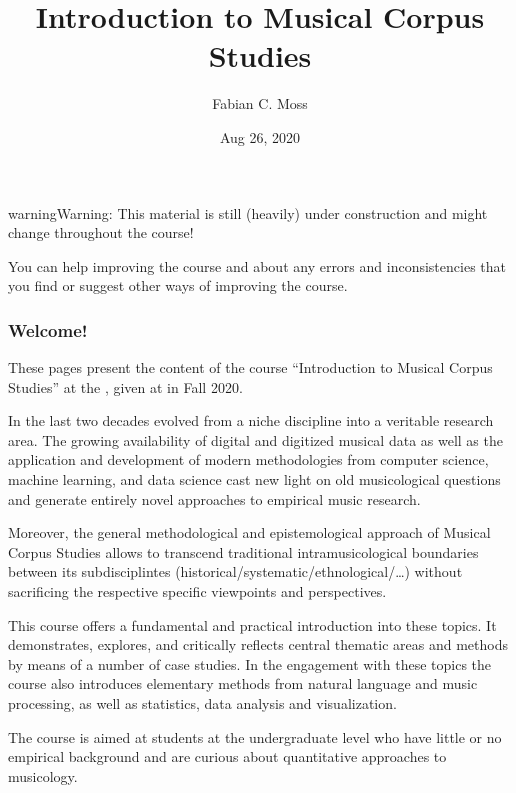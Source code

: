 \documentclass[letterpaper,10pt,english]{sphinxmanual}
\title{Introduction to Musical Corpus Studies}
\date{Aug 26, 2020}
\author{Fabian C.\@{} Moss}
\begin{document}
\pagestyle{empty}
\sphinxmaketitle
\pagestyle{plain}
\sphinxtableofcontents
\pagestyle{normal}
\label{\detokenize{index::doc}}


\begin{sphinxadmonition}{warning}{Warning:}
This material is still (heavily) under construction and might change throughout the course!

You can help improving the course and  about any errors and inconsistencies that you find
or suggest other ways of improving the course.
\end{sphinxadmonition}
\subsubsection*{Welcome!}

These pages present the content of the course “Introduction to Musical Corpus Studies” at the ,
given at  in Fall 2020.

In the last two decades  evolved from a niche discipline into a veritable research area.
The growing availability of digital and digitized musical data as well as the application and development of modern
methodologies from computer science, machine learning, and data science cast new light on old musicological questions
and generate entirely novel approaches to empirical music research.

Moreover, the general methodological and epistemological approach of Musical Corpus Studies allows to transcend traditional
intra\sphinxhyphen{}musicological boundaries between its sub\sphinxhyphen{}disciplintes (historical/systematic/ethnological/…) without sacrificing the
respective specific viewpoints and perspectives.

This course offers a fundamental and practical introduction into these topics.
It demonstrates, explores, and critically reflects central thematic areas and methods by means of a number of case studies.
In the engagement with these topics the course also introduces elementary methods from natural language and music processing,
as well as statistics, data analysis and visualization.

The course is aimed at students at the undergraduate level who have little or no empirical background and are curious
about quantitative approaches to musicology.
\end{document}
